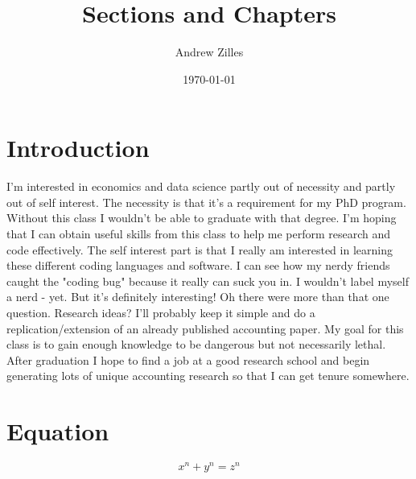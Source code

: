\documentclass{article}
\title{Sections and Chapters}
\author{Andrew Zilles}
\date{\today}
\begin{document}
\maketitle

\section{Introduction}
I'm interested in economics and data science partly out of necessity and partly out of self interest. The necessity is that it's a requirement for my PhD program. Without this class I wouldn't be able to graduate with that degree. I'm hoping that I can obtain useful skills from this class to help me perform research and code effectively. The self interest part is that I really am interested in learning these different coding languages and software. I can see how my nerdy friends caught the "coding bug" because it really can suck you in. I wouldn't label myself a nerd - yet. But it's definitely interesting! Oh there were more than that one question. Research ideas? I'll probably keep it simple and do a replication/extension of an already published accounting paper. My goal for this class is to gain enough knowledge to be dangerous but not necessarily lethal. After graduation I hope to find a job at a good research school and begin generating lots of unique accounting research so that I can get tenure somewhere. 

\section{Equation}
\[ x^n + y^n = z^n \]

%
\end{document}
